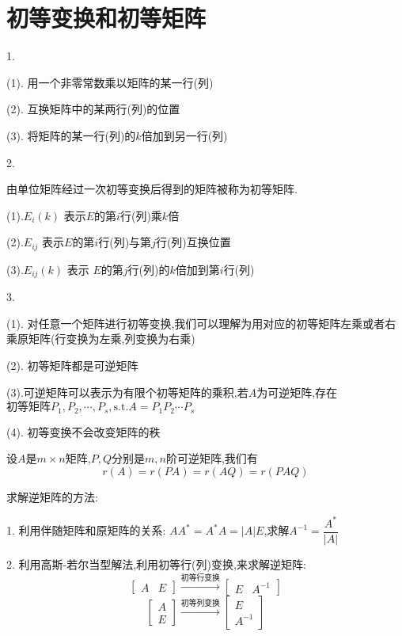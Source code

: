 \section{初等变换和初等矩阵}
\begin{definition}[初等变换和初等矩阵]
	1. 
	
	(1). 用一个非零常数乘以矩阵的某一行(列)
	
	(2). 互换矩阵中的某两行(列)的位置
	
	(3). 将矩阵的某一行(列)的$k$倍加到另一行(列)
	
	2. 
	
	由单位矩阵经过一次初等变换后得到的矩阵被称为初等矩阵.
	
	(1).$E_{i}(k)$ 表示$E$的第$i$行(列)乘$k$倍
	
	(2).$E_{ij}$ 表示$E$的第$i$行(列)与第$j$行(列)互换位置
	
	(3).$E_{ij}(k)$ 表示 $E$的第$j$行(列)的$k$倍加到第$i$行(列)
	
	3.  
	
	(1). 对任意一个矩阵进行初等变换,我们可以理解为用对应的初等矩阵左乘或者右乘原矩阵(行变换为左乘,列变换为右乘)
	
	(2). 初等矩阵都是可逆矩阵
	
	(3).$\text{可逆矩阵可以表示为有限个初等矩阵的乘积,若}A\text{为可逆矩阵,存在}$ $\text{初等矩阵} P_{1},P_{2},\cdots,P_{s},\text{s.t.} A=P_{1}P_{2}\cdots P_{s}$
	
	(4). 初等变换不会改变矩阵的秩
	
	设$A$是$m\times n$矩阵,$P,Q$分别是$m,n$阶可逆矩阵,我们有
	$$r(A)=r(PA)=r(AQ)=r(PAQ)$$
\end{definition}
\begin{anymark}[总结]
	求解逆矩阵的方法:  
	
	1. 利用伴随矩阵和原矩阵的关系:  $AA^{*}=A^{*}A=|A|E$,求解$A^{-1}=\dfrac{A^{*}}{|A|}$
	
	2. 利用高斯-若尔当型解法,利用初等行(列)变换,来求解逆矩阵:  
	$$\left[
	\begin{matrix}
		A&E
	\end{matrix}
	\right]\xrightarrow{\text{初等行变换}}\left[
	\begin{matrix}
		E&A^{-1}
	\end{matrix}
	\right]$$
	$$\left[
	\begin{matrix}
		A\\E
	\end{matrix}
	\right]\xrightarrow{\text{初等列变换}}\left[
	\begin{matrix}
		E\\A^{-1}
	\end{matrix}
	\right]$$
	
\end{anymark}
